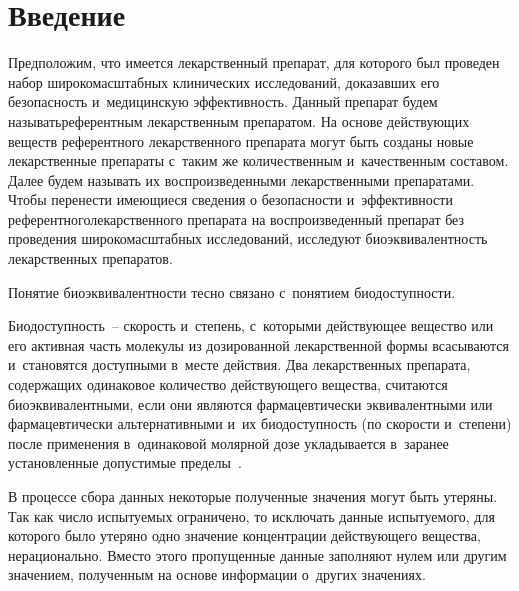   
\vspace*{3pt}



\thispagestyle{headings}

\begin{multicols}{2}

\label{st\stat}

\section{Введение}

\vspace*{-3pt}

Предположим, что имеется лекарственный препа\-рат, для которого 
был проведен набор  широкомасштабных клинических исследований, 
доказавших его безопасность и~медицинскую эф\-фективность. Данный 
препарат будем называть\linebreak референтным лекарственным препаратом. 
На основе действующих веществ референтного лекарственного препарата 
могут быть созданы новые лекар\-ст\-вен\-ные препараты с~таким же 
количественным и~качественным составом. Далее будем называть 
их воспроизведенными лекарственными препаратами. Чтобы 
перенести имеющиеся сведения о безопасности и~эффективности 
референтного\linebreak лекарственного препарата на воспроизведенный 
препарат без проведения широкомасштабных исследований, исследуют 
биоэквивалентность лекарственных препаратов.


Понятие биоэквивалентности тесно связано с~понятием биодоступности.

Биодоступность~-- скорость и~степень, с~которыми действующее вещество 
или его активная часть молекулы из дозированной лекарственной формы 
всасываются и~становятся доступными в~месте действия. Два лекарственных 
препарата, содержащих одинаковое количество действующего вещества, 
считаются биоэквивалентными, если они являются фармацевтически 
эквивалентными или фармацевтически альтернативными и~их биодоступность 
(по скорости и~степени) после применения в~одинаковой молярной дозе 
укладывается в~заранее установленные допустимые пределы~\cite{defin}.


В процессе сбора данных некоторые полученные значения могут быть утеряны. 
Так как число испытуемых ограничено, то исключать данные испытуемого,
 для которого было утеряно одно значение концентрации действующего вещества,
  нерационально. Вместо этого пропущенные данные заполняют нулем или другим значением,
   полученным на основе информации о~других значениях. 
   

\end{multicols}
